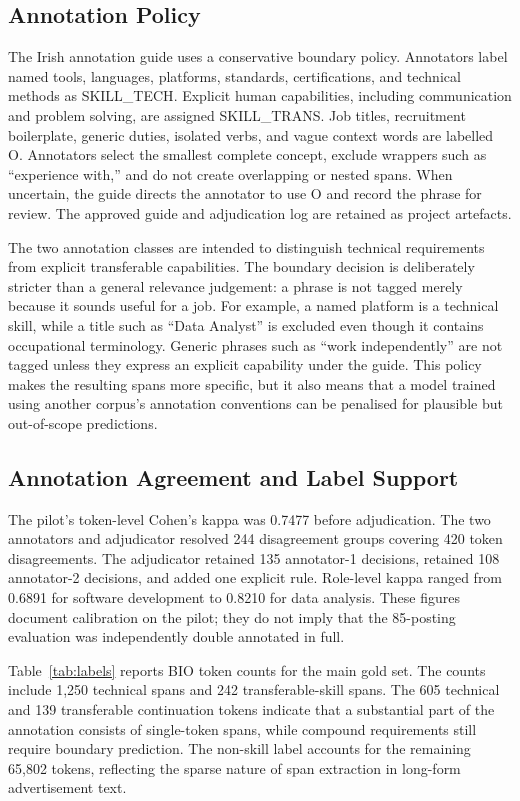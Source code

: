 \documentclass[conference]{IEEEtran}
\begin{document}
\subsection{Annotation Policy}
The Irish annotation guide uses a conservative boundary policy. Annotators label named tools, languages, platforms, standards, certifications, and technical methods as \textsf{SKILL\_TECH}. Explicit human capabilities, including communication and problem solving, are assigned \textsf{SKILL\_TRANS}. Job titles, recruitment boilerplate, generic duties, isolated verbs, and vague context words are labelled \textsf{O}. Annotators select the smallest complete concept, exclude wrappers such as ``experience with,'' and do not create overlapping or nested spans. When uncertain, the guide directs the annotator to use \textsf{O} and record the phrase for review. The approved guide and adjudication log are retained as project artefacts.

The two annotation classes are intended to distinguish technical requirements from explicit transferable capabilities. The boundary decision is deliberately stricter than a general relevance judgement: a phrase is not tagged merely because it sounds useful for a job. For example, a named platform is a technical skill, while a title such as ``Data Analyst'' is excluded even though it contains occupational terminology. Generic phrases such as ``work independently'' are not tagged unless they express an explicit capability under the guide. This policy makes the resulting spans more specific, but it also means that a model trained using another corpus's annotation conventions can be penalised for plausible but out-of-scope predictions.

\subsection{Annotation Agreement and Label Support}
The pilot's token-level Cohen's kappa was 0.7477 before adjudication. The two annotators and adjudicator resolved 244 disagreement groups covering 420 token disagreements. The adjudicator retained 135 annotator-1 decisions, retained 108 annotator-2 decisions, and added one explicit rule. Role-level kappa ranged from 0.6891 for software development to 0.8210 for data analysis. These figures document calibration on the pilot; they do not imply that the 85-posting evaluation was independently double annotated in full.

Table~\ref{tab:labels} reports BIO token counts for the main gold set. The counts include 1,250 technical spans and 242 transferable-skill spans. The 605 technical and 139 transferable continuation tokens indicate that a substantial part of the annotation consists of single-token spans, while compound requirements still require boundary prediction. The non-skill label accounts for the remaining 65,802 tokens, reflecting the sparse nature of span extraction in long-form advertisement text.
\end{document}
